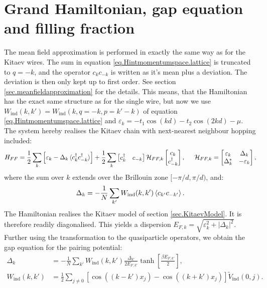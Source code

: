 \section{Grand Hamiltonian, gap equation and filling fraction} \label{sec.grandhamiltonian.lattice}
The mean field approximation is performed in exactly the same way as for the Kitaev wires. The sum in equation \eqref{eq.Hintmomentumspace.lattice} is truncated to $q = -k$, and the operator $c_kc_{-k}$ is written as it's mean plus a deviation. The deviation is then only kept up to first order. See section \ref{sec.meanfieldapproximation} for the details. This means, that the Hamiltonian has the exact same structure as for the single wire, but now we use $W_{\text{ind}}(k, k') = W_{\text{ind}}(k, q = -k, p = k' - k)$ of equation \eqref{eq.Hintmomentumspace.lattice} and $\varepsilon_k = - t_1\cos(kd) - t_2\cos(2kd) - \mu$. The system hereby realises the Kitaev chain with next-nearest neighbour hopping included: 
\begin{equation}
H_{FF} = \frac{1}{2}\sum_k \left[\varepsilon_k - \Delta_k \braket {c^\dagger_k c^\dagger_{-k}}\right] + \frac{1}{2}\sum_{k} \begin{bmatrix} c_k^\dagger & c_{-k} \end{bmatrix} \mathcal{H}_{FF,k} \begin{bmatrix} c_k \\ c^\dagger_{-k} \end{bmatrix}, \hspace{0.5cm} \mathcal{H}_{FF,k} = \begin{bmatrix} \varepsilon_k & \Delta_k \\ \Delta^*_k & -\varepsilon_k \end{bmatrix}, 
\label{eq.grandhamiltonian.lattice}
\end{equation}
where the sum over $k$ extends over the Brillouin zone $[-\pi/d, \pi/d )$, and: 
\begin{equation}
\Delta_k = - \frac{1}{N}\sum_{k'} W_{\text{ind}}(k,k')\braket{c_{k'}c_{-k'}}.
\label{eq.pairingpotential.lattice}
\end{equation}
The Hamiltonian realises the Kitaev model of section \ref{sec.KitaevModel}. It is therefore readily diagonalised. This yields a dispersion $E_{F,k} = \sqrt{\varepsilon^2_k + |\Delta_k|^2}$. Further using the transformation to the quasiparticle operators, we obtain the gap equation for the pairing potential: 
\begin{align}
\Delta_k &= - \frac{1}{N}\sum_{k'} W_{\text{ind}}(k,k')\frac{\Delta_{k'}}{2E_{F,k'}}\tanh\left[\frac{\beta E_{F,k'}}{2}\right], \nonumber \\
W_{\text{ind}}(k,k') &= \frac{1}{2}\sum_{j\neq 0} \left[\cos((k - k')x_j) - \cos((k + k')x_j) \right]\tilde{V}_{\text{ind}}(0, j).
\label{eq.gapequation.lattice}
\end{align}
